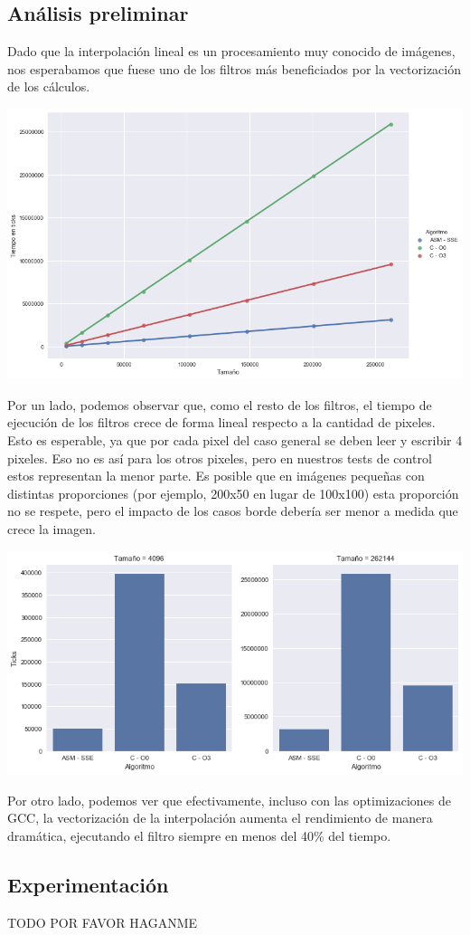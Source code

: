 \subsection{Análisis preliminar}

Dado que la interpolación lineal es un procesamiento muy conocido de imágenes, nos esperabamos que fuese uno de los filtros más beneficiados por la vectorización de los cálculos.

\begin{center}
  \includegraphics[scale=0.5]{img/linearZoom_CvsASMvsO3.png}
\end{center}

Por un lado, podemos observar que, como el resto de los filtros, el tiempo de ejecución de los filtros crece de forma lineal respecto a la cantidad de pixeles. Esto es esperable, ya que por cada pixel del caso general se deben leer y escribir 4 pixeles. Eso no es así para los otros pixeles, pero en nuestros tests de control estos representan la menor parte. Es posible que en imágenes pequeñas con distintas proporciones (por ejemplo, 200x50 en lugar de 100x100) esta proporción no se respete, pero el impacto de los casos borde debería ser menor a medida que crece la imagen.

\begin{center}
  \includegraphics[scale=0.5]{img/linearZoom_CvsASMvsO3_bars.png}
\end{center}

Por otro lado, podemos ver que efectivamente, incluso con las optimizaciones de GCC, la vectorización de la interpolación aumenta el rendimiento de manera dramática, ejecutando el filtro siempre en menos del 40\% del tiempo.

\subsection{Experimentación}

TODO POR FAVOR HAGANME